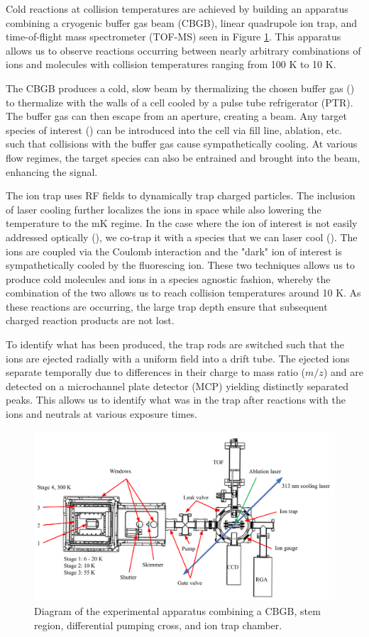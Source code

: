 Cold reactions at collision temperatures are achieved by building an apparatus combining a cryogenic buffer gas beam (CBGB), linear quadrupole ion trap, and time-of-flight mass spectrometer (TOF-MS) seen in Figure \ref{fig: apparatus}. This apparatus allows us to observe reactions occurring between nearly arbitrary combinations of ions and molecules with collision temperatures ranging from 100 K to 10 K.

The CBGB produces a cold, slow beam by thermalizing the chosen buffer gas () to thermalize with the walls of a cell cooled by a pulse tube refrigerator (PTR). The buffer gas can then escape from an aperture, creating a beam. Any target species of interest () can be introduced into the cell via fill line, ablation, etc. such that collisions with the buffer gas cause sympathetically cooling. At various flow regimes, the target species can also be entrained and brought into the beam, enhancing the signal.

The ion trap uses RF fields to dynamically trap charged particles. The inclusion of laser cooling further localizes the ions in space while also lowering the temperature to the mK regime. In the case where the ion of interest is not easily addressed optically (), we co-trap it with a species that we can laser cool (). The ions are coupled via the Coulomb interaction and the "dark" ion of interest is sympathetically cooled by the fluorescing ion. These two techniques allows us to produce cold molecules and ions in a species agnostic fashion, whereby the combination of the two allows us to reach collision temperatures around 10 K. As these reactions are occurring, the large trap depth ensure that subsequent charged reaction products are not lost.

To identify what has been produced, the trap rods are switched such that the ions are ejected radially with a uniform field into a drift tube. The ejected ions separate temporally due to differences in their charge to mass ratio ($m/z$) and are detected on a microchannel plate detector (MCP) yielding distinctly separated peaks. This allows us to identify what was in the trap after reactions with the ions and neutrals at various exposure times.

\begin{figure}[H]
	\centering
	\includegraphics[width=\textwidth]{images/Apparatus.pdf}
	\caption{Diagram of the experimental apparatus combining a CBGB, stem region, differential pumping cross, and ion trap chamber.}
	\label{fig: apparatus}
\end{figure}